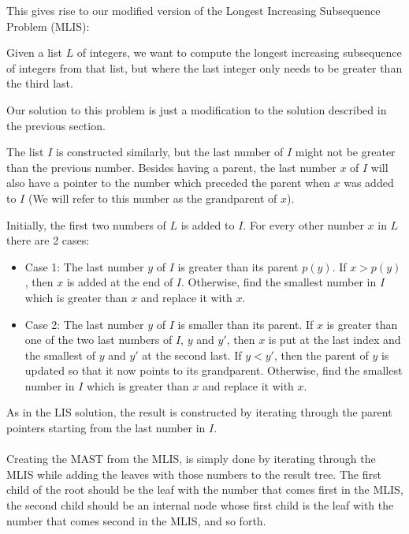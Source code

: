 This gives rise to our modified version of the Longest Increasing Subsequence Problem (MLIS):

Given a list $L$ of integers, we want to compute the longest increasing subsequence of integers from that list, but where the last integer only needs to be greater than the third last.

Our solution to this problem is just a modification to the solution described in the previous section.

The list $I$ is constructed similarly, but the last number of $I$ might not be greater than the previous number. Besides having a parent, the last number $x$ of $I$ will also have a pointer to the number which preceded the parent when $x$ was added to $I$ (We will refer to this number as the grandparent of $x$).

Initially, the first two numbers of $L$ is added to $I$. For every other number $x$ in $L$ there are 2 cases:

\begin{itemize}
	\item Case 1: The last number $y$ of $I$ is greater than its parent $p(y)$.
	\subitem If $x > p(y)$, then $x$ is added at the end of $I$.
	\subitem Otherwise, find the smallest number in $I$ which is greater than $x$ and replace it with $x$.
	\item Case 2: The last number $y$ of $I$ is smaller than its parent.
	\subitem If $x$ is greater than one of the two last numbers of $I$, $y$ and $y'$, then $x$ is put at the last index and the smallest of $y$ and $y'$ at the second last.
	\subsubitem If $y < y'$, then the parent of $y$ is updated so that it now points to its grandparent.
	\subitem Otherwise, find the smallest number in $I$ which is greater than $x$ and replace it with $x$.
\end{itemize}


As in the LIS solution, the result is constructed by iterating through the parent pointers starting from the last number in $I$.\\
\\
Creating the MAST from the MLIS, is simply done by iterating through the MLIS while adding the leaves with those numbers to the result tree. The first child of the root should be the leaf with the number that comes first in the MLIS, the second child should be an internal node whose first child is the leaf with the number that comes second in the MLIS, and so forth.


